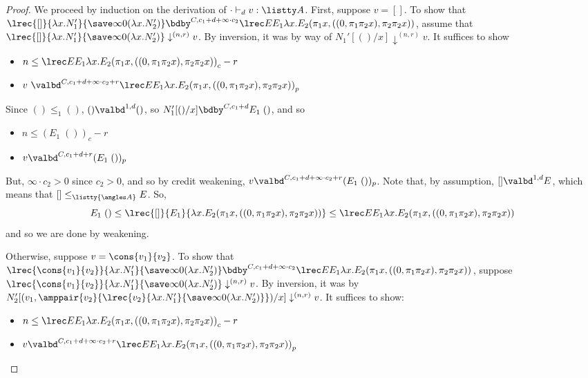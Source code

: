 \lreclemma*
\begin{proof}
We proceed by induction on the derivation of $\cdot \vdash_d v : \listty A$.
First, suppose $v = []$.  To show that $\lrec {[]} {\lambda x.N_1'} {\save \infty 0 {(\lambda x.N_2')}} \bdby^{C,c_1+d+\infty \cdot c_2} \lrec E {E_1} {\lambda x. E_2 (\pi_1 x,((0,\pi_1 \pi_2 x),\pi_2\pi_2 x))}$, assume that  $\lrec {[]} {\lambda x.N_1'} {\save \infty 0 {(\lambda x.N_2')}} \downarrow^{(n,r)} v$. By inversion, it was by way of $N_1'[()/x] \downarrow^{(n,r)} v$. It suffices to show 
\begin{itemize}
   \item $n \leq \lrec E {E_1} {\lambda x. E_2 (\pi_1 x,((0,\pi_1 \pi_2 x),\pi_2\pi_2 x))}_c - r$
   \item $v\ \valbd^{C,c_1+d+\infty \cdot c_2 + r} \lrec E {E_1} {\lambda x. E_2 (\pi_1 x,((0,\pi_1 \pi_2 x),\pi_2\pi_2 x)) }_p$
\end{itemize}
Since $() \leq_1 ()$, $() \valbd^{1,d} ()$, so $N_1'[()/x] \bdby^{C,c_1+d} E_1 \; ()$, and so
\begin{itemize}
  \item $n \leq (E_1 \; ())_c - r$
  \item $v \valbd^{C,c_1+d+r} (E_1 \; ())_p$
\end{itemize}
But, $\infty \cdot c_2 > 0$ since $c_2 > 0$, and so by credit weakening, $v \valbd^{C,c_1+d+\infty \cdot c_2 +r} (E_1 \; ())_p$. Note that, by assumption, $[] \valbd^{1,d} E$, which means that $[] \leq_{\listty {\angles A}} E$. So,
$$
E_1 \; () \leq \lrec {[]} {E_1} {\lambda x. E_2 (\pi_1 x,((0,\pi_1 \pi_2 x),\pi_2\pi_2 x)) } \leq \lrec E {E_1} {\lambda x. E_2 (\pi_1 x,((0,\pi_1 \pi_2 x),\pi_2\pi_2 x)) }
$$
and so we are done by weakening.

Otherwise, suppose $v = \cons {v_1} {v_2}$. To show that $\lrec {\cons {v_1} {v_2}} {\lambda x.N_1'} {\save \infty 0 {(\lambda x.N_2')}} \bdby^{C,c_1+d+\infty \cdot c_2} \lrec E {E_1} {\lambda x. E_2 (\pi_1 x,((0,\pi_1 \pi_2 x),\pi_2\pi_2 x)) }$, suppose $\lrec {\cons {v_1} {v_2}} {\lambda x.N_1'} {\save \infty 0 {(\lambda x.N_2')}} \downarrow^{(n,r)} v$. By inversion, it was by $N_2'[(v_1,\amppair {v_2} {\lrec {v_2} {\lambda x.N_1'} {\save \infty 0 {(\lambda x.N_2')}}})/x] \downarrow^{(n,r)} v$. It suffices to show:
\begin{itemize}
  \item $n \leq \lrec E {E_1} {\lambda x. E_2 (\pi_1 x,((0,\pi_1 \pi_2 x),\pi_2\pi_2 x)) }_c - r$
  \item $v \valbd^{C,c_1+d+\infty \cdot c_2 + r} \lrec E {E_1} {\lambda x. E_2 (\pi_1 x,((0,\pi_1 \pi_2 x),\pi_2\pi_2 x)) }_p$
\end{itemize}


\end{proof}
